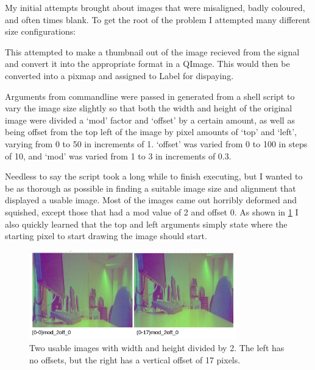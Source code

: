 \documentclass[11pt]{article} %
\begin{document}
My initial attempts brought about images that were misaligned, badly coloured, and often times blank. To get the root of the problem I attempted many different size configurations:
\begin{frame}[fragile]
	\vspace{-20pt}
	
	\label{code:shell1}
\end{frame}
This attempted to make a thumbnail out of the image recieved from the signal and convert it into the appropriate format in a QImage. This would then be converted into a pixmap and assigned to Label for dispaying.

Arguments from commandline were passed in generated from a shell script to vary the image size slightly so that both the width and height of the original image were divided a ‘mod’ factor and ‘offset’ by a certain amount, as well as being offset from the top left of the image by pixel amounts of ‘top’ and ‘left’, varying from 0 to 50 in increments of 1. ‘offset’ was varied from 0 to 100 in steps of 10, and ‘mod’ was varied from 1 to 3 in increments of 0.3.

Needless to say the script took a long while to finish executing, but I wanted to be as thorough as possible in finding a suitable image size and alignment that displayed a usable image. Most of the images came out horribly deformed and squished, except those that had a mod value of 2 and offset 0. As shown in \cref{fig:shell1} I also quickly learned that the top and left arguments simply state where the starting pixel to start drawing the image should start.
\begin{figure}
	\begin{center}
		\includegraphics[width=0.8\textwidth]{../images/qpix/shell1}
	\end{center}
	\vspace{-20pt}
	\caption{Two usable images with width and height divided by 2. The left has no offsets, but the right has a vertical offset of 17 pixels. }
	\label{fig:shell1}
\end{figure}
\end{document}
